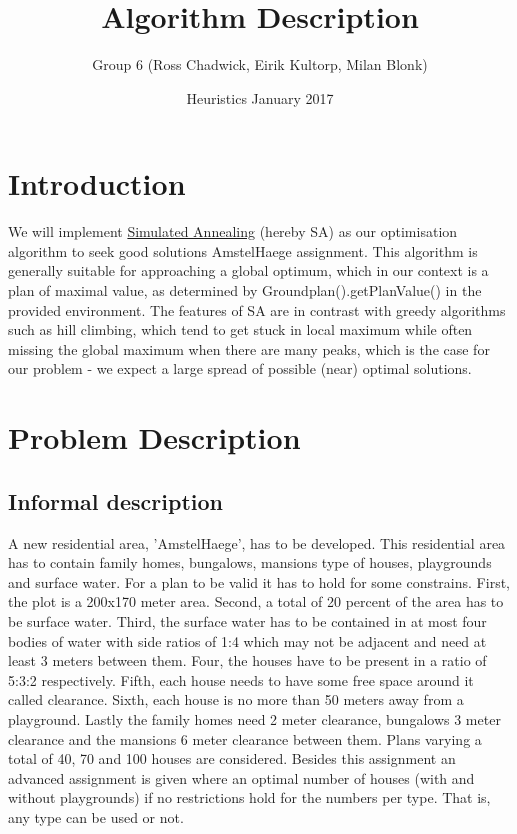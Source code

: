 \documentclass{article}
\title{Algorithm Description}
\author{ Group 6 (Ross Chadwick, Eirik Kultorp, Milan Blonk) }
\date{Heuristics January 2017}
\begin{document}
\maketitle

\section{Introduction}

We will implement \href{https://en.wikipedia.org/wiki/Simulated_annealing}{Simulated Annealing} (hereby SA) as our optimisation algorithm to seek good solutions AmstelHaege assignment. This algorithm is generally suitable for approaching a global optimum, which in our context is a plan of maximal value, as determined by Groundplan().getPlanValue() in the provided environment. The features of SA are in contrast with greedy algorithms such as hill climbing, which tend to get stuck in local maximum while often missing the global maximum when there are many peaks, which is the case for our problem - we expect a large spread of possible (near) optimal solutions. 

\section{Problem Description}

\subsection{Informal description}

A new residential area, 'AmstelHaege', has to be developed. This residential area has to contain family homes, bungalows, mansions type of houses, playgrounds and surface water. For a plan to be valid it has to hold for some constrains. First, the plot is a 200x170 meter area. Second, a total of 20 percent of the area has to be surface water. Third, the surface water has to be contained in at most four bodies of water with side ratios of 1:4 which may not be adjacent and need at least 3 meters between them. Four, the houses have to be present in a ratio of 5:3:2 respectively. Fifth, each house needs to have some free space around it called clearance. Sixth, each house is no more than 50 meters away from a playground. Lastly the family homes need 2 meter clearance, bungalows 3 meter clearance and the mansions 6 meter clearance between them. Plans varying a total of 40, 70 and 100 houses are considered. Besides this assignment an advanced assignment is given where an optimal number of houses (with and without playgrounds) if no restrictions hold for the numbers per type. That is, any type can be used or not.
\end{document}

